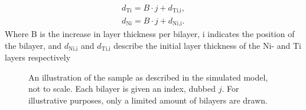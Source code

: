 \begin{eqnarray}
	d_{\textrm{Ti}} = B \cdot j + d_{\textrm{Ti,i}}, \\
	d_{\textrm{Ni}} = B \cdot j + d_{\textrm{Ni,i}}.
\end{eqnarray}
Where B is the increase in layer thickness per bilayer, i indicates the position of the bilayer, and $d_{\textrm{Ni,i}}$ and $d_{\textrm{Ti,i}}$ describe the initial layer thickness of the Ni- and Ti layers respectively
\begin{figure}
	\centering
	\def\svgwidth{\textwidth}
	
	\caption{An illustration of the sample as described in the simulated model, not to scale. Each bilayer is given an index, dubbed $j$. For illustrative purposes, only a limited amount of bilayers are drawn.}
	\label{modeldescription}
\end{figure}